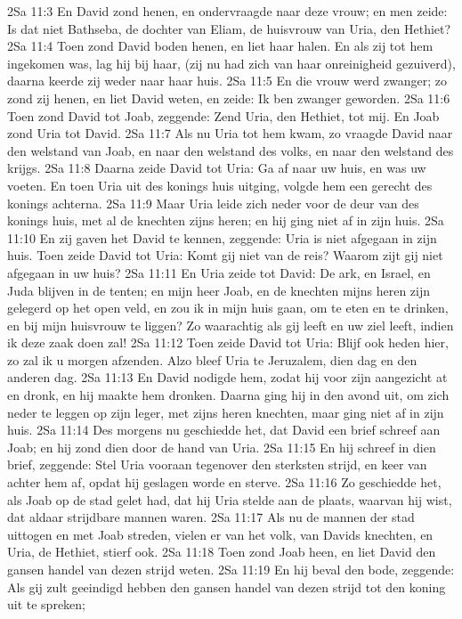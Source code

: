 2Sa 11:3  En David zond henen, en ondervraagde naar deze vrouw; en men zeide: Is dat niet Bathseba, de dochter van Eliam, de huisvrouw van Uria, den Hethiet?
2Sa 11:4  Toen zond David boden henen, en liet haar halen. En als zij tot hem ingekomen was, lag hij bij haar, (zij nu had zich van haar onreinigheid gezuiverd), daarna keerde zij weder naar haar huis.
2Sa 11:5  En die vrouw werd zwanger; zo zond zij henen, en liet David weten, en zeide: Ik ben zwanger geworden.
2Sa 11:6  Toen zond David tot Joab, zeggende: Zend Uria, den Hethiet, tot mij. En Joab zond Uria tot David.
2Sa 11:7  Als nu Uria tot hem kwam, zo vraagde David naar den welstand van Joab, en naar den welstand des volks, en naar den welstand des krijgs.
2Sa 11:8  Daarna zeide David tot Uria: Ga af naar uw huis, en was uw voeten. En toen Uria uit des konings huis uitging, volgde hem een gerecht des konings achterna.
2Sa 11:9  Maar Uria leide zich neder voor de deur van des konings huis, met al de knechten zijns heren; en hij ging niet af in zijn huis.
2Sa 11:10  En zij gaven het David te kennen, zeggende: Uria is niet afgegaan in zijn huis. Toen zeide David tot Uria: Komt gij niet van de reis? Waarom zijt gij niet afgegaan in uw huis?
2Sa 11:11  En Uria zeide tot David: De ark, en Israel, en Juda blijven in de tenten; en mijn heer Joab, en de knechten mijns heren zijn gelegerd op het open veld, en zou ik in mijn huis gaan, om te eten en te drinken, en bij mijn huisvrouw te liggen? Zo waarachtig als gij leeft en uw ziel leeft, indien ik deze zaak doen zal!
2Sa 11:12  Toen zeide David tot Uria: Blijf ook heden hier, zo zal ik u morgen afzenden. Alzo bleef Uria te Jeruzalem, dien dag en den anderen dag.
2Sa 11:13  En David nodigde hem, zodat hij voor zijn aangezicht at en dronk, en hij maakte hem dronken. Daarna ging hij in den avond uit, om zich neder te leggen op zijn leger, met zijns heren knechten, maar ging niet af in zijn huis.
2Sa 11:14  Des morgens nu geschiedde het, dat David een brief schreef aan Joab; en hij zond dien door de hand van Uria.
2Sa 11:15  En hij schreef in dien brief, zeggende: Stel Uria vooraan tegenover den sterksten strijd, en keer van achter hem af, opdat hij geslagen worde en sterve.
2Sa 11:16  Zo geschiedde het, als Joab op de stad gelet had, dat hij Uria stelde aan de plaats, waarvan hij wist, dat aldaar strijdbare mannen waren.
2Sa 11:17  Als nu de mannen der stad uittogen en met Joab streden, vielen er van het volk, van Davids knechten, en Uria, de Hethiet, stierf ook.
2Sa 11:18  Toen zond Joab heen, en liet David den gansen handel van dezen strijd weten.
2Sa 11:19  En hij beval den bode, zeggende: Als gij zult geeindigd hebben den gansen handel van dezen strijd tot den koning uit te spreken;
